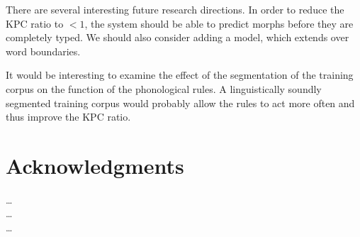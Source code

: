 \documentclass{llncs}
\begin{document}
There are several interesting future research directions. In order to
reduce the KPC ratio to $< 1$, the system should be able to predict
morphs before they are completely typed. We should also consider
adding a model, which extends over word boundaries.

It would be interesting to examine the effect of the segmentation of
the training corpus on the function of the phonological rules. A
linguistically soundly segmented training corpus would probably allow
the rules to act more often and thus improve the KPC ratio.

\section{Acknowledgments}
\ldots\\
\ldots\\
\ldots




\end{document}
